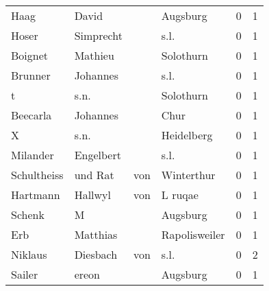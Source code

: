 \begin{center}
\begin{tiny}
\begin{longtabu}{llllrr}
                     Haag &                              David &             &                                    Augsburg &          0 &         1 \\
                    Hoser &                          Simprecht &             &                                        s.l. &          0 &         1 \\
                  Boignet &                            Mathieu &             &                                   Solothurn &          0 &         1 \\
                  Brunner &                           Johannes &             &                                        s.l. &          0 &         1 \\
                        t &                               s.n. &             &                                   Solothurn &          0 &         1 \\
                 Beecarla &                           Johannes &             &                                        Chur &          0 &         1 \\
                        X &                               s.n. &             &                                  Heidelberg &          0 &         1 \\
                 Milander &                          Engelbert &             &                                        s.l. &          0 &         1 \\
              Schultheiss &                            und Rat &         von &                                  Winterthur &          0 &         1 \\
                 Hartmann &                            Hallwyl &         von &                                     L ruqae &          0 &         1 \\
                   Schenk &                                  M &             &                                    Augsburg &          0 &         1 \\
                      Erb &                           Matthias &             &                               Rapolisweiler &          0 &         1 \\
                  Niklaus &                           Diesbach &         von &                                        s.l. &          0 &         2 \\
                   Sailer &                              ereon &             &                                    Augsburg &          0 &         1 \\

\end{longtabu}
\end{tiny}
\end{center}
